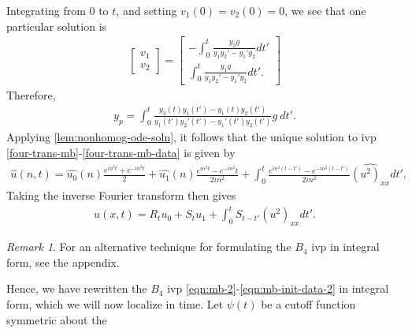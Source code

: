 \documentclass[12pt,reqno]{amsart}
\numberwithin{equation}{section}  %
\numberwithin{figure}{section}
\newcommand{\wh}{\widehat}
\theoremstyle{plain}
\theoremstyle{definition}
\theoremstyle{remark}
\newtheorem{remark}{Remark}
\begin{document}
Integrating from $0$ to $t$, and setting $v_{1}(0) = v_{2}(0) = 0$, we see that
one particular solution is
%
%
\begin{equation*}
\begin{split}
\begin{bmatrix}
  v_{1}
  \\
  v_{2}
\end{bmatrix}=
\begin{bmatrix}
 -\int_{0}^{t} \frac{y_{2}g}{y_{1}y_{2}' - y_{1}' y_{2}} dt' \\
  \int_{0}^{t}\frac{y_{1}g}{y_{1}y_{2}' - y_{1}' y_{2}}dt'.
\end{bmatrix}
\end{split}
\end{equation*}
Therefore,
%
%
\begin{equation*}
\begin{split}
  y_{p} =  \int_{0}^{t}
  \frac{ y_{2}(t)y_{1}(t') - y_{1}(t)y_{2}(t')}{y_{1}(t')y_{2}'(t') -
  y_{1}'(t') y_{2}(t')}g \ dt'.
\end{split}
\end{equation*}
%
%
%
%
%
Applying \autoref{lem:nonhomog-ode-soln}, it follows that 
the unique solution to ivp
\eqref{four-trans-mb}-\eqref{four-trans-mb-data} is given by
%
%
\begin{equation*}
\begin{split}
\wh{u}(n, t) = \wh{u_{0}}(n) \frac{e^{in^{2}t} + e^{-in^{2}t}}{2} +
  \wh{u_{1}}(n)\frac{e^{in^{2}t} - e^{-in^{2}}t}{2 i n^{2}} +
  \int_{0}^{t}\frac{e^{in^{2}(t-t')}-e^{-in^{2}(t-t')}}{2in^{2}}
  \wh{(u^{2})_{xx}} dt'.
\end{split}
\end{equation*}
%
%
Taking the inverse Fourier transform then gives
%
\begin{equation}
  \begin{split}
    u(x,t) = R_{t}u_{0} + S_{t}u_{1} + \int_{0}^{t} S_{t-t'}
    (u^{2})_{xx} dt'.
  \end{split}
  \label{eqn:integral-form}
\end{equation}
%
%
\begin{framed}
  \begin{remark}
For an alternative technique for formulating the $B_{4}$ ivp in integral form,
see the appendix.
\end{remark}
\end{framed}
Hence, we have rewritten the $B_{4}$ ivp
\eqref{eqn:mb-2}-\eqref{eqn:mb-init-data-2} in integral form, which we will now
localize in time. 
Let $\psi(t)$ be a cutoff function symmetric about the 
\end{document}
